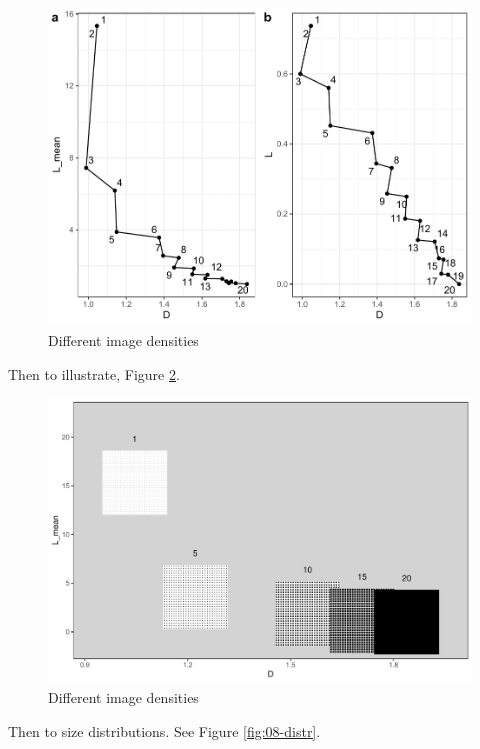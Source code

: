 \documentclass[
  12pt,
]{book}
\begin{document}
\begin{figure}

{\centering \includegraphics[width=0.9\linewidth]{bookdown-demo_files/figure-latex/08-dens-1} 

}

\caption{Different image densities}\label{fig:08-dens}
\end{figure}

Then to illustrate, Figure \ref{fig:08-dens-im}.

\begin{figure}
\hypertarget{fig:08-dens-im}{%
\centering
\includegraphics{Results/fig08_dens_im.pdf}
\caption{Different image densities}\label{fig:08-dens-im}
}
\end{figure}

Then to size distributions. See Figure \ref{fig:08-distr}.
\end{document}
